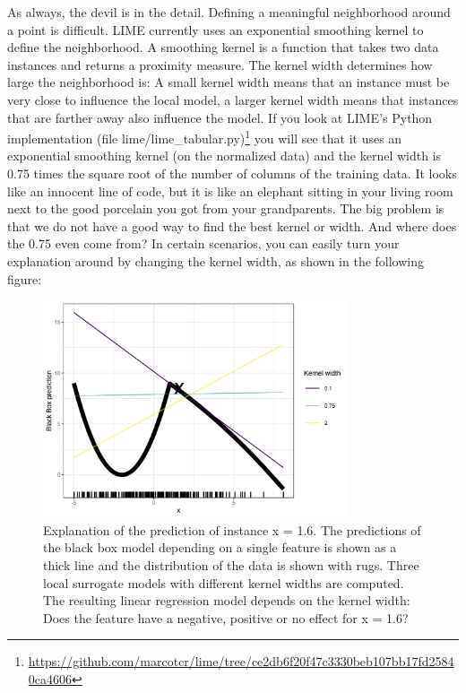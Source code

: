 \documentclass[
  10pt,
]{scrbook}
\renewcommand{\href}[2]{#2\footnote{\url{#1}}}
\begin{document}
As always, the devil is in the detail.
Defining a meaningful neighborhood around a point is difficult.
LIME currently uses an exponential smoothing kernel to define the neighborhood.
A smoothing kernel is a function that takes two data instances and returns a proximity measure.
The kernel width determines how large the neighborhood is:
A small kernel width means that an instance must be very close to influence the local model, a larger kernel width means that instances that are farther away also influence the model.
If you look at \href{https://github.com/marcotcr/lime/tree/ce2db6f20f47c3330beb107bb17fd25840ca4606}{LIME's Python implementation (file lime/lime\_tabular.py)} you will see that it uses an exponential smoothing kernel (on the normalized data) and the kernel width is 0.75 times the square root of the number of columns of the training data.
It looks like an innocent line of code, but it is like an elephant sitting in your living room next to the good porcelain you got from your grandparents.
The big problem is that we do not have a good way to find the best kernel or width.
And where does the 0.75 even come from?
In certain scenarios, you can easily turn your explanation around by changing the kernel width, as shown in the following figure:

\begin{figure}

{\centering \includegraphics[width=0.8\textwidth]{images/lime-fail-1} 

}

\caption{Explanation of the prediction of instance x = 1.6. The predictions of the black box model depending on a single feature is shown as a thick line and the distribution of the data is shown with rugs. Three local surrogate models with different kernel widths are computed. The resulting linear regression model depends on the kernel width: Does the feature have a negative, positive or no effect for x = 1.6?}\label{fig:lime-fail}
\end{figure}
\end{document}
